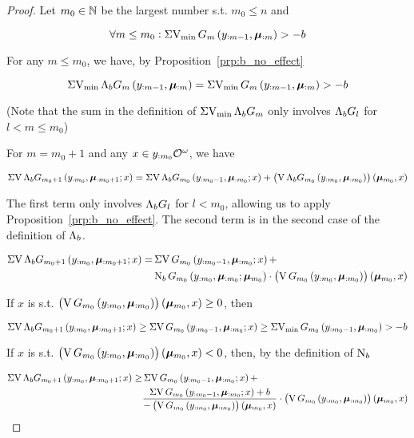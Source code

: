 \begin{proof}

Let ${m_0 \in \mathbb{N}}$ be the largest number s.t. ${m_0 \leq n}$ and 

$$\forall m \leq m_0: \operatorname{\Sigma V_{\min}} G_m\left(y_{:m-1},\bm{\mu}_{:m}\right) > -b$$

For any ${m \leq m_0}$, we have, by Proposition~\ref{prp:b_no_effect}

$$\operatorname{\Sigma V_{\min}} \Lambda_b G_m\left(y_{:m-1},\bm{\mu}_{:m}\right)=\operatorname{\Sigma V_{\min}} G_m\left(y_{:m-1},\bm{\mu}_{:m}\right) > -b$$

(Note that the sum in the definition of ${\operatorname{\Sigma V_{\min}} \Lambda_b G_m}$ only involves ${\Lambda_b G_l}$ for ${l < m \leq m_0}$)

For ${m=m_0+1}$ and any $x \in y_{:m_0}\mathcal{O}^\omega$, we have

$$\operatorname{\Sigma V} \Lambda_b G_{m_0+1}\left(y_{:m_0},\bm{\mu}_{:m_0+1};x\right) = \operatorname{\Sigma V} \Lambda_b G_{m_0}\left(y_{:m_0-1},\bm{\mu}_{:m_0};x\right) + \left(\operatorname{V} \Lambda_b G_{m_0}\left(y_{:m_0},\bm{\mu}_{:m_0}\right)\right)\left(\bm{\mu}_{m_0},x\right)$$

The first term only involves ${\Lambda_b G_l}$ for ${l < m_0}$, allowing us to apply Proposition~\ref{prp:b_no_effect}. The second term is in the second case of the definition of $\Lambda_b$.

\begin{align*}
\operatorname{\Sigma V} \Lambda_b G_{m_0+1}\left(y_{:m_0},\bm{\mu}_{:m_0+1};x\right) = &\operatorname{\Sigma V} G_{m_0}\left(y_{:m_0-1},\bm{\mu}_{:m_0};x\right) +\\ &\operatorname{N}_b G_{m_0}\left(y_{:m_0},\bm{\mu}_{:m_0};\bm{\mu}_{m_0}\right) \cdot \left(\operatorname{V} G_{m_0}\left(y_{:m_0},\bm{\mu}_{:m_0}\right)\right)\left(\bm{\mu}_{m_0},x\right)
\end{align*}

If ${x}$ is s.t. ${\left(\operatorname{V} G_{m_0}\left(y_{:m_0},\bm{\mu}_{:m_0}\right)\right)\left(\bm{\mu}_{m_0},x\right) \geq 0}$, then

\[\operatorname{\Sigma V} \Lambda_b G_{m_0+1}\left(y_{:m_0},\bm{\mu}_{:m_0+1};x\right) \geq \operatorname{\Sigma V} G_{m_0}\left(y_{:m_0-1},\bm{\mu}_{:m_0};x\right)\geq \operatorname{\Sigma V_{\min}} G_{m_0}\left(y_{:m_0-1},\bm{\mu}_{:m_0}\right) > -b\]

If ${x}$ is s.t. ${\left(\operatorname{V} G_{m_0}\left(y_{:m_0},\bm{\mu}_{:m_0}\right)\right)\left(\bm{\mu}_{m_0},x\right) < 0}$, then, by the definition of $\operatorname{N}_b$

\begin{align*}
\operatorname{\Sigma V} \Lambda_b G_{m_0+1}\left(y_{:m_0},\bm{\mu}_{:m_0+1};x\right) \geq &\operatorname{\Sigma V} G_{m_0}\left(y_{:m_0-1},\bm{\mu}_{:m_0};x\right)+ \\
&\frac{\operatorname{\Sigma V} G_{m_0}\left(y_{:m_0-1},\bm{\mu}_{:m_0};x\right) + b}{-\left(\operatorname{V} G_{m_0}\left(y_{:m_0},\bm{\mu}_{:m_0}\right)\right)\left(\bm{\mu}_{m_0},x\right)} \cdot \left(\operatorname{V} G_{m_0}\left(y_{:m_0},\bm{\mu}_{:m_0}\right)\right)\left(\bm{\mu}_{m_0},x\right)
\end{align*}


\end{proof}
